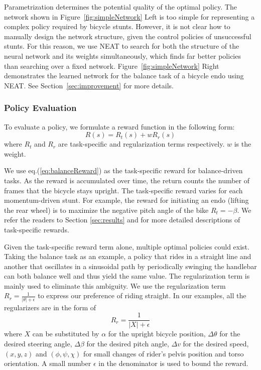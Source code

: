 Parametrization determines the potential quality of the optimal policy. The network shown in Figure~\ref{fig:simpleNetwork} Left is too simple for representing a complex policy required by bicycle stunts. However, it is not clear how to manually design the network structure, given the control policies of unsuccessful stunts. For this reason, we use NEAT to search for both the structure of the neural network and its weights simultaneously, which finds far better policies than searching over a fixed network. Figure~\ref{fig:simpleNetwork} Right demonstrates the learned network for the balance task of a bicycle endo using NEAT. See Section~\ref{sec:improvement} for more details.

\subsubsection{Policy Evaluation}
To evaluate a policy, we formulate a reward function in the following form:
\begin{equation}
R(s)=R_t(s)+wR_r(s)
\end{equation}
where $R_t$ and $R_r$ are task-specific and regularization terms respectively. $w$ is the weight.

We use eq.(\ref{eq:balanceReward}) as the task-specific reward for balance-driven tasks. As the reward is accumulated over time, the return counts the number of frames that the bicycle stays upright. The task-specific reward varies for each momentum-driven stunt. For example, the reward for initiating an endo (lifting the rear wheel) is to maximize the negative pitch angle of the bike $R_t=-\beta$. We refer the readers to Section \ref{sec:results} and for more detailed descriptions of task-specific rewards.

Given the task-specific reward term alone, multiple optimal policies could exist. Taking the balance task as an example, a policy that rides in a straight line and another that oscillates in a sinusoidal path by periodically swinging the handlebar can both balance well and thus yield the same value. The regularization term is mainly used to eliminate this ambiguity. We use the regularization term $R_r=\frac{1}{|\theta|+\epsilon}$ to express our preference of riding straight. In our examples, all the regularizers are in the form of
\begin{displaymath}
R_r = \frac{1}{|X|+\epsilon}
\end{displaymath}
where $X$ can be substituted by $\alpha$ for the upright bicycle position, $\Delta \theta$ for the desired steering angle, $\Delta \beta$ for the desired pitch angle, $\Delta v$ for the desired speed, $(x, y, z)$ and $(\phi, \psi, \chi)$ for small changes of rider's pelvis position and torso orientation. A small number $\epsilon$ in the denominator is used to bound the reward.

